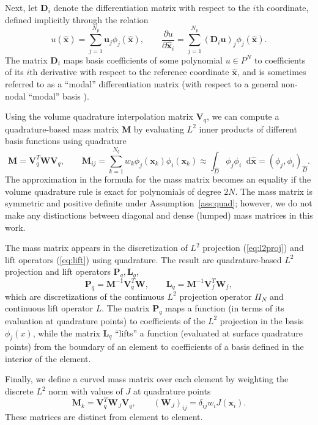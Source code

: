 \documentclass[preprint,10pt]{article}
\theoremstyle{definition}
\theoremstyle{lemma}
\theoremstyle{theorem}
\theoremstyle{assumption}
\renewcommand{\hat}{\widehat}
\newcommand{\pd}[2]{\frac{\partial#1}{\partial#2}}
\newcommand{\LRp}[1]{\left( #1 \right)}
\newcommand{\note}[1]{{\color{blue}{#1}}}
\newcommand*\diff[1]{\mathop{}\!{\mathrm{d}#1}} %
\begin{document}
{Next, let ${\bm{D}}_i$ denote the differentiation matrix with respect to the $i$th coordinate, defined implicitly through the relation
\[
u(\hat{\bm{x}}) = \sum_{j=1}^{N_p} \bm{u}_j \phi_j(\hat{\bm{x}}), \qquad \pd{u}{\hat{\bm{x}}_i} = \sum_{j=1}^{N_p} \LRp{{\bm{D}}_i \bm{u}}_j\phi_j(\hat{\bm{x}}).
\]
The matrix ${\bm{D}}_i$ maps basis coefficients of some polynomial $u \in P^N$ to coefficients of its $i$th derivative with respect to the reference coordinate $\hat{\bm{x}}$, and is sometimes referred to as a ``modal'' differentiation matrix (with respect to a general non-nodal ``modal'' basis \cite{hicken2016multidimensional}).  


Using the volume quadrature interpolation matrix $\bm{V}_q$, we can compute a quadrature-based mass matrix $\bm{M}$ by evaluating $L^2$ inner products of different basis functions using quadrature
\[
\bm{M} = \bm{V}_q^T\bm{W}\bm{V}_q, \qquad \bm{M}_{ij} = \sum_{k=1}^{N_q} w_k \phi_j(\bm{x}_k)\phi_i(\bm{x}_k) \approx \int_{\hat{D}}\phi_j\phi_i \diff{\hat{\bm{x}}} = \LRp{\phi_j,\phi_i}_{\hat{D}}.
\]
The approximation in the formula for the mass matrix becomes an equality if the volume quadrature rule is exact for polynomials of degree $2N$.  The mass matrix is symmetric and positive definite under Assumption~\ref{ass:quad}; however, we do not make any distinctions between diagonal and dense (lumped) mass matrices in this work.  

The mass matrix appears in the discretization of $L^2$ projection (\ref{eq:l2proj}) and lift operators (\ref{eq:lift}) using quadrature.  The result are quadrature-based $L^2$ projection and lift operators $\bm{P}_q, \bm{L}_q$, 
\begin{equation}
\bm{P}_q = \bm{M}^{-1}\bm{V}_q^T\bm{W}, \qquad \bm{L}_q = \bm{M}^{-1}\bm{V}_f^T \bm{W}_f,
\label{eq:projlift}
\end{equation}
which are discretizations of the continuous $L^2$ projection operator $\Pi_N$ and continuous lift operator $L$.  The matrix $\bm{P}_q$ maps a function (in terms of its evaluation at quadrature points) to coefficients of the $L^2$ projection in the basis $\phi_j(x)$, while the matrix $\bm{L}_q$ ``lifts'' a function (evaluated at surface quadrature points) from the boundary of an element to coefficients of a basis defined in the interior of the element.  

Finally, we define a curved mass matrix over each element by weighting the discrete $L^2$ norm with values of $J$ at quadrature points
\[
\bm{M}_k = \bm{V}_q^T \bm{W}_J \bm{V}_q, \qquad \LRp{\bm{W}_J}_{ij} = \delta_{ij} w_i J(\bm{x}_i).
\]
These matrices are distinct from element to element.
\note{finish}

}
\end{document}
